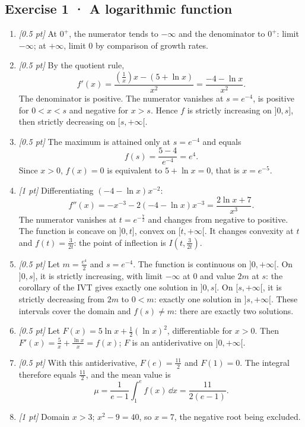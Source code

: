 \subsection*{Exercise 1 · A logarithmic function}\begin{enumerate}

\item \textit{[0.5 pt]} At $0^+$, the numerator tends to $-\infty$ and the denominator to $0^+$: limit $-\infty$; at $+\infty$, limit $0$ by comparison of growth rates.

\item \textit{[0.5 pt]} By the quotient rule,
\[f'(x)=\frac{(\frac{1}{x})x-(5+\ln x)}{x^2}=\frac{-4-\ln x}{x^2}.\]
The denominator is positive. The numerator vanishes at $s=e^{-4}$, is positive for $0<x<s$ and negative for $x>s$. Hence $f$ is strictly increasing on $]0,s]$, then strictly decreasing on $[s,+\infty[$.

\item \textit{[0.5 pt]} The maximum is attained only at $s=e^{-4}$ and equals
\[f(s)=\frac{5- 4}{e^{-4}}=e^{4}.\]
Since $x>0$, $f(x)=0$ is equivalent to $5+\ln x=0$, that is $x=e^{-5}$.

\item \textit{[1 pt]} Differentiating $(-4-\ln x)x^{-2}$:
\[f''(x)=-x^{-3}-2(-4-\ln x)x^{-3}=\frac{2\ln x+7}{x^3}.\]
The numerator vanishes at $t=e^{-\frac{7}{2}}$ and changes from negative to positive. The function is concave on $]0,t]$, convex on $[t,+\infty[$. It changes convexity at $t$ and $f(t)=\frac{3}{2t}$: the point of inflection is $I(t,\frac{3}{2t})$.

\item \textit{[0.5 pt]} Let $m=\frac{e^{4}}{2}$ and $s=e^{-4}$. The function is continuous on $]0,+\infty[$. On $]0,s]$, it is strictly increasing, with limit $-\infty$ at $0$ and value $2m$ at $s$: the corollary of the IVT gives exactly one solution in $]0,s[$. On $[s,+\infty[$, it is strictly decreasing from $2m$ to $0<m$: exactly one solution in $]s,+\infty[$. These intervals cover the domain and $f(s)\ne m$: there are exactly two solutions.

\item \textit{[0.5 pt]} Let $F(x)=5\ln x+\frac12(\ln x)^2$, differentiable for $x>0$. Then $F'(x)=\frac{5}{x}+\frac{\ln x}{x}=f(x)$; $F$ is an antiderivative on $]0,+\infty[$.

\item \textit{[0.5 pt]} With this antiderivative, $F(e)=\frac{11}{2}$ and $F(1)=0$. The integral therefore equals $\frac{11}{2}$, and the mean value is
\[\mu=\frac{1}{e-1}\int_1^e f(x)\,\dd x=\frac{11}{2(e-1)}.\]

\item \textit{[1 pt]} Domain $x>3$; $x^2-9=40$, so $x=7$, the negative root being excluded.

\end{enumerate}

